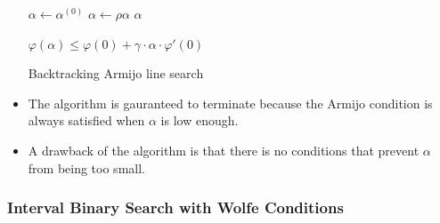 \documentclass[10pt]{article}
\begin{document}
\begin{itemize}
    \begin{algorithm}[t]
    \begin{algorithmic}
        \State $\alpha \gets \alpha^{(0)}$
            \State $\alpha \gets \rho \alpha$
        \EndWhile
        \State \Return $\alpha$
        \EndProcedure     
        
        \State

            \State \Return $\varphi(\alpha) \leq \varphi(0) + \gamma \cdot \alpha \cdot \varphi'(0)$
        \EndProcedure
    \end{algorithmic}
    \caption{Backtracking Armijo line search}
    \label{algo:backtracking-armijo-line-search}
    \end{algorithm}

    \item The algorithm is gauranteed to terminate because the Armijo condition is always satisfied when $\alpha$ is low enough.
    
    \item A drawback of the algorithm is that there is no conditions that prevent $\alpha$ from being too small.
\end{itemize}

\subsubsection{Interval Binary Search with Wolfe Conditions}
\end{document}
